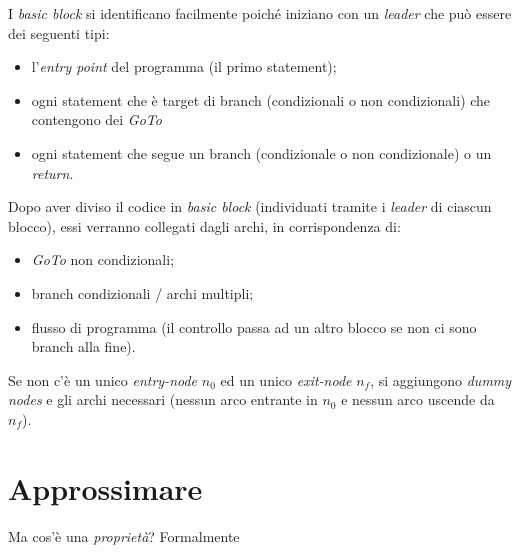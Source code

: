 \documentclass{article}
\begin{document}
            I \textit{basic block} si identificano facilmente poiché iniziano con un \textit{leader} che può essere dei seguenti tipi:
            \begin{itemize}
                \item l'\textit{entry point} del programma (il primo statement);
                \item ogni statement che è target di branch (condizionali o non condizionali) che contengono dei \textit{GoTo}
                \item ogni statement che segue un branch (condizionale o non condizionale) o un \textit{return}.
            \end{itemize}
            Dopo aver diviso il codice in \textit{basic block} (individuati tramite i \textit{leader} di ciascun blocco), essi verranno collegati dagli archi, in corrispondenza di:
            \begin{itemize}
                \item \textit{GoTo} non condizionali;
                \item branch condizionali / archi multipli;
                \item flusso di programma (il controllo passa ad un altro blocco se non ci sono branch alla fine).
            \end{itemize}
            Se non c'è un unico \textit{entry-node} $n_0$ ed un unico \textit{exit-node} $n_f$, si aggiungono \textit{dummy nodes} e gli archi necessari (nessun arco entrante in $n_0$ e nessun arco uscende da $n_f$).

    \section{Approssimare}
        Ma cos'è una \textit{proprietà}? Formalmente
\end{document}
